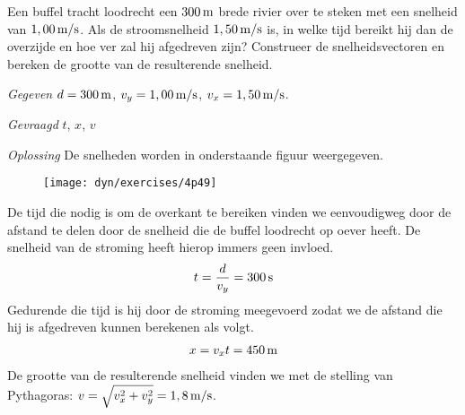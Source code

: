 
\begin{exercise}




 Een buffel tracht loodrecht een $300\rm\,m$ brede rivier over te steken met een snelheid van $1,00\rm\,m/s$. Als de stroomsnelheid $1,50\rm\,m/s$ is, in welke tijd bereikt hij dan de overzijde en hoe ver zal hij afgedreven zijn? Construeer de snelheidsvectoren en bereken de grootte van de resulterende snelheid.
\begin{oplossing}
\item[\textit{Gegeven}]$d=300\rm\,m$, $v_y=1,00\rm\,m/s$, $v_x=1,50\rm\,m/s$.
\item[\textit{Gevraagd}]$t$, $x$, $v$
\item[\textit{Oplossing}]De snelheden worden in onderstaande figuur weergegeven.
\begin{figure}[h]
\begin{center}
\texttt{[image: dyn/exercises/4p49]}
\end{center}
\end{figure}
De tijd die nodig is om de overkant te bereiken vinden we eenvoudigweg door de afstand te delen door de snelheid die de buffel loodrecht op oever heeft. De snelheid van de stroming heeft hierop immers geen invloed.
\begin{eqnarray*}
t=\frac{d}{v_y}=300\rm\,s
\end{eqnarray*}
Gedurende die tijd is hij door de stroming meegevoerd zodat we de afstand die hij is afgedreven kunnen berekenen als volgt.
\begin{eqnarray*}
x=v_xt=450\rm\,m
\end{eqnarray*}
De grootte van de resulterende snelheid vinden we met de stelling van Pythagoras: $v=\sqrt{v_x^2+v_y^2}=1,8\rm\,m/s$.
\end{oplossing}

\end{exercise}
